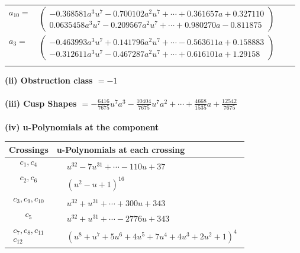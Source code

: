 \documentclass[1p]{elsarticle_modified}
\theoremstyle{definition}
\begin{document}
\begin{tabular}{m{7pt} m{180pt} m{7pt} m{180pt} }
\flushright $a_{10}=$&$\begin{pmatrix}-0.368581 a^{3} u^{7}-0.700102 a^{2} u^{7}+\cdots+0.361657 a+0.327110\\0.0635458 a^{3} u^{7}-0.209567 a^{2} u^{7}+\cdots+0.980270 a-0.811875\end{pmatrix}$ \\
\flushright $a_{3}=$&$\begin{pmatrix}-0.463993 a^{3} u^{7}+0.141796 a^{2} u^{7}+\cdots-0.563611 a+0.158883\\-0.312611 a^{3} u^{7}-0.467287 a^{2} u^{7}+\cdots+0.616101 a+1.29158\end{pmatrix}$\\&\end{tabular}
\flushleft \textbf{(ii) Obstruction class $= -1$}\\~\\
\flushleft \textbf{(iii) Cusp Shapes $= -\frac{6416}{7675} u^7 a^3-\frac{10404}{7675} u^7 a^2+\cdots+\frac{4668}{1535} a+\frac{12542}{7675}$}\\~\\
\newpage\renewcommand{\arraystretch}{1}
\flushleft \textbf{(iv) u-Polynomials at the component}\newline \\
\begin{tabular}{m{50pt}|m{274pt}}
Crossings & \hspace{64pt}u-Polynomials at each crossing \\
\hline $$\begin{aligned}c_{1},c_{4}\end{aligned}$$&$\begin{aligned}
&u^{32}-7 u^{31}+\cdots-110 u+37
\end{aligned}$\\
\hline $$\begin{aligned}c_{2},c_{6}\end{aligned}$$&$\begin{aligned}
&(u^2- u+1)^{16}
\end{aligned}$\\
\hline $$\begin{aligned}c_{3},c_{9},c_{10}\end{aligned}$$&$\begin{aligned}
&u^{32}+u^{31}+\cdots+300 u+343
\end{aligned}$\\
\hline $$\begin{aligned}c_{5}\end{aligned}$$&$\begin{aligned}
&u^{32}+u^{31}+\cdots-2776 u+343
\end{aligned}$\\
\hline $$\begin{aligned}c_{7},c_{8},c_{11}\\c_{12}\end{aligned}$$&$\begin{aligned}
&(u^8+u^7+5 u^6+4 u^5+7 u^4+4 u^3+2 u^2+1)^4
\end{aligned}$\\
\hline
\end{tabular}\\~\\
\end{document}
